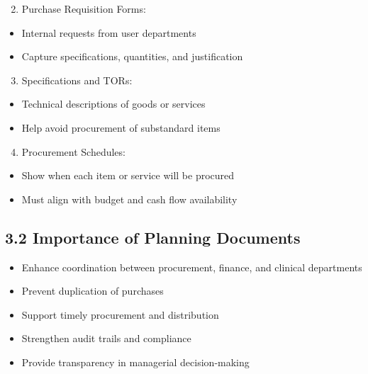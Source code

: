 \documentclass[10pt]{article}
\begin{document}
\begin{enumerate}
  \setcounter{enumi}{1}
  \item Purchase Requisition Forms:
\end{enumerate}

\begin{itemize}
  \item Internal requests from user departments
  \item Capture specifications, quantities, and justification
\end{itemize}

\begin{enumerate}
  \setcounter{enumi}{2}
  \item Specifications and TORs:
\end{enumerate}

\begin{itemize}
  \item Technical descriptions of goods or services
  \item Help avoid procurement of substandard items
\end{itemize}

\begin{enumerate}
  \setcounter{enumi}{3}
  \item Procurement Schedules:
\end{enumerate}

\begin{itemize}
  \item Show when each item or service will be procured
  \item Must align with budget and cash flow availability
\end{itemize}

\subsection*{3.2 Importance of Planning Documents}
\begin{itemize}
  \item Enhance coordination between procurement, finance, and clinical departments
  \item Prevent duplication of purchases
  \item Support timely procurement and distribution
  \item Strengthen audit trails and compliance
  \item Provide transparency in managerial decision-making
\end{itemize}
\end{document}
